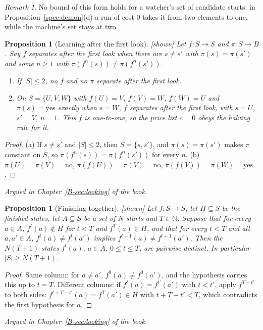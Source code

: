 \documentclass[11pt, a4paper]{article}
\theoremstyle{plain}
\newtheorem{proposition}[theorem]{Proposition}
\theoremstyle{definition}
\theoremstyle{remark}
\newtheorem{remark}[theorem]{Remark}
\newcommand{\N}{\mathbb{N}}
\newcommand{\cost}{c}
\newcommand{\argued}[1]{\par\noindent\textit{Argued in Chapter~\ref{B-#1} of the book.}\par}
\newcommand{\kind}[1]{\textup{[#1]}}
\begin{document}
\begin{remark}\label{spec:watcher-not-bound}
No bound of this form holds for a watcher's set of candidate starts: in Proposition~\ref{spec:demon}(d) a
run of cost $0$ takes it from two elements to one, while the machine's set stays at two.
\end{remark}

\begin{proposition}[Learning after the first look]\label{spec:ring} \kind{shown}
Let $f:S\to S$ and $\pi:S\to B$. Say $f$ \emph{separates after the first look} when there are $s\ne s'$
with $\pi(s)=\pi(s')$ and some $n\ge 1$ with $\pi(f^n(s))\ne\pi(f^n(s'))$.
\begin{enumerate}[label=(\alph*)]
\item If $|S|\le 2$, no $f$ and no $\pi$ separate after the first look.
\item On $S=\{U,V,W\}$ with $f(U)=V$, $f(V)=W$, $f(W)=U$ and $\pi(s)=\mathrm{yes}$ exactly when $s=W$, $f$
separates after the first look, with $s=U$, $s'=V$, $n=1$. This $f$ is one-to-one, so the price list
$\cost=0$ obeys the halving rule for it.
\end{enumerate}
\end{proposition}
\begin{proof}
(a) If $s\ne s'$ and $|S|\le 2$, then $S=\{s,s'\}$, and $\pi(s)=\pi(s')$ makes $\pi$ constant on $S$, so
$\pi(f^n(s))=\pi(f^n(s'))$ for every $n$. (b) $\pi(U)=\pi(V)=\mathrm{no}$, $\pi(f(U))=\pi(V)=\mathrm{no}$,
$\pi(f(V))=\pi(W)=\mathrm{yes}$.
\end{proof}
\argued{sec:looking}

\begin{proposition}[Finishing together]\label{spec:finish-together} \kind{shown}
Let $f:S\to S$, let $H\subseteq S$ be the finished states, let $A\subseteq S$ be a set of $N$ starts and
$T\in\N$. Suppose that for every $a\in A$, $f^t(a)\notin H$ for $t<T$ and $f^T(a)\in H$, and that for every
$t<T$ and all $a,a'\in A$, $f^t(a)\ne f^t(a')$ implies $f^{t+1}(a)\ne f^{t+1}(a')$. Then the $N(T+1)$ states
$f^t(a)$, $a\in A$, $0\le t\le T$, are pairwise distinct. In particular $|S|\ge N(T+1)$.
\end{proposition}
\begin{proof}
Same column: for $a\ne a'$, $f^0(a)\ne f^0(a')$, and the hypothesis carries this up to $t=T$. Different
columns: if $f^t(a)=f^{t'}(a')$ with $t<t'$, apply $f^{T-t'}$ to both sides: $f^{t+T-t'}(a)=f^T(a')\in H$
with $t+T-t'<T$, which contradicts the first hypothesis for $a$.
\end{proof}
\argued{sec:looking}
\end{document}
